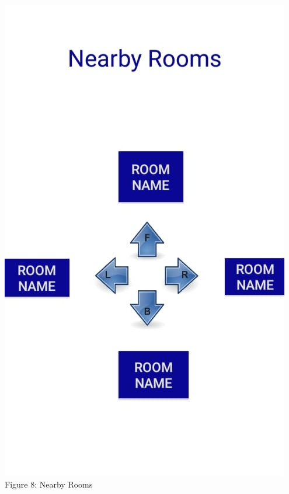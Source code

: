 \documentclass{article}
\begin{document}
\begin{center}
\includegraphics[scale=0.3]{f3}
\\Figure 8: Nearby Rooms
\end{center}
\end{document}
